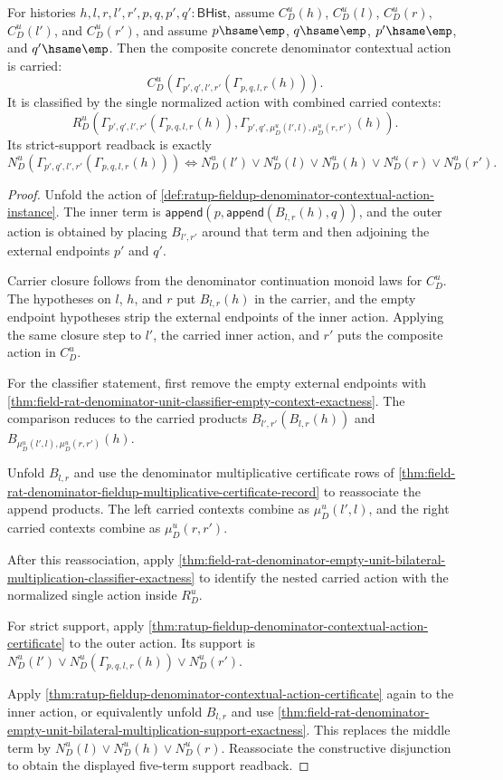 \begin{theorem}
\label{thm:ratup-fieldup-denominator-contextual-action-composition-closure}
For histories $h,l,r,l',r',p,q,p',q':\mathsf{BHist}$, assume
$C_D^u(h)$, $C_D^u(l)$, $C_D^u(r)$, $C_D^u(l')$, and $C_D^u(r')$, and assume
$p\hsame\emp$, $q\hsame\emp$, $p'\hsame\emp$, and $q'\hsame\emp$. Then the
composite concrete denominator contextual action is carried:
$$
C_D^u(\Gamma_{p',q',l',r'}(\Gamma_{p,q,l,r}(h))).
$$
It is classified by the single normalized action with combined carried
contexts:
$$
R_D^u(\Gamma_{p',q',l',r'}(\Gamma_{p,q,l,r}(h)),
\Gamma_{p',q',\mu_D^u(l',l),\mu_D^u(r,r')}(h)).
$$
Its strict-support readback is exactly
$$
N_D^u(\Gamma_{p',q',l',r'}(\Gamma_{p,q,l,r}(h)))
\Longleftrightarrow
N_D^u(l')\lor N_D^u(l)\lor N_D^u(h)\lor N_D^u(r)\lor N_D^u(r').
$$
\end{theorem}
\begin{proof}
Unfold the action of
\autoref{def:ratup-fieldup-denominator-contextual-action-instance}. The inner
term is
$\mathsf{append}(p,\mathsf{append}(B_{l,r}(h),q))$, and the outer action is
obtained by placing $B_{l',r'}$ around that term and then adjoining the external
endpoints $p'$ and $q'$.

Carrier closure follows from the denominator continuation monoid laws for
$C_D^u$. The hypotheses on $l$, $h$, and $r$ put $B_{l,r}(h)$ in the carrier,
and the empty endpoint hypotheses strip the external endpoints of the inner
action. Applying the same closure step to $l'$, the carried inner action, and
$r'$ puts the composite action in $C_D^u$.

For the classifier statement, first remove the empty external endpoints with
\autoref{thm:field-rat-denominator-unit-classifier-empty-context-exactness}.
The comparison reduces to the carried products
$B_{l',r'}(B_{l,r}(h))$ and
$B_{\mu_D^u(l',l),\mu_D^u(r,r')}(h)$.

Unfold $B_{l,r}$ and use the denominator multiplicative certificate rows of
\autoref{thm:field-rat-denominator-fieldup-multiplicative-certificate-record}
to reassociate the append products. The left carried contexts combine as
$\mu_D^u(l',l)$, and the right carried contexts combine as
$\mu_D^u(r,r')$.

After this reassociation, apply
\autoref{thm:field-rat-denominator-empty-unit-bilateral-multiplication-classifier-exactness}
to identify the nested carried action with the normalized single action inside
$R_D^u$.

For strict support, apply
\autoref{thm:ratup-fieldup-denominator-contextual-action-certificate} to the
outer action. Its support is
$N_D^u(l')\lor N_D^u(\Gamma_{p,q,l,r}(h))\lor N_D^u(r')$.

Apply
\autoref{thm:ratup-fieldup-denominator-contextual-action-certificate} again to
the inner action, or equivalently unfold $B_{l,r}$ and use
\autoref{thm:field-rat-denominator-empty-unit-bilateral-multiplication-support-exactness}.
This replaces the middle term by
$N_D^u(l)\lor N_D^u(h)\lor N_D^u(r)$. Reassociate the constructive
disjunction to obtain the displayed five-term support readback.
\end{proof}
